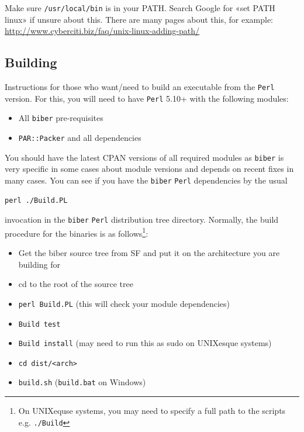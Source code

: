 \documentclass{ltxdockit}
\begin{document}
\noindent Make sure \verb+/usr/local/bin+ is in your PATH. Search Google for «set PATH
linux» if unsure about this. There are many pages about this, for example:
\url{http://www.cyberciti.biz/faq/unix-linux-adding-path/}


\subsection{Building}

Instructions for those who want/need to build an executable from the
\verb+Perl+ version. For this, you will need to have \verb+Perl+ 5.10+ with
the following modules:

\begin{itemize}
\item All \verb+biber+ pre-requisites
\item \verb+PAR::Packer+ and all dependencies
\end{itemize}

\noindent You should have the latest CPAN versions of all required modules
as \verb+biber+ is very specific in some cases about module versions and
depends on recent fixes in many cases. You can see if you have the
\verb+biber+ \verb+Perl+ dependencies by the usual

\begin{verbatim}
perl ./Build.PL
\end{verbatim}

\noindent invocation in the \verb+biber+ \verb+Perl+ distribution tree
directory. Normally, the build procedure for the binaries is as
follows\footnote{On UNIXequse systems, you may need to specify a full
  path to the scripts e.g. \texttt{./Build}}:

\begin{itemize}
\item Get the biber source tree from SF and put it on the architecture
  you are building for
\item cd to the root of the source tree
\item \verb+perl Build.PL+ (this will check your module
  dependencies)
\item \verb+Build test+
\item \verb+Build install+ (may need to run this as sudo on
  UNIXesque systems)
\item \verb+cd dist/<arch>+
\item \verb+build.sh+ (\verb+build.bat+ on Windows)
\end{itemize}
\end{document}
